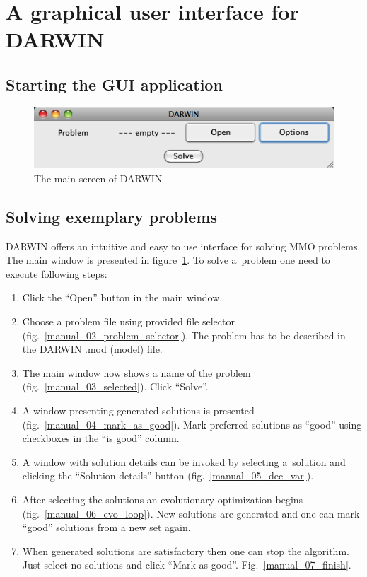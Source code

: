 \label{user-manual}

\section*{A graphical user interface for DARWIN}

\subsection*{Starting the GUI application}

\begin{figure}[htb]
  \centering
  \includegraphics[scale=0.7]{img/manual/01_main_screen}
  \caption{The main screen of DARWIN}
  \label{manual_01_main}
\end{figure}

\subsection*{Solving exemplary problems}

DARWIN offers an intuitive and easy to use interface for solving MMO
problems. The main window is presented in figure~\ref{manual_01_main}. To
solve a~problem one need to execute following steps:

\begin{enumerate}
\item Click the ``Open'' button in the main window.
\item Choose a problem file using provided file selector
  (fig.~\ref{manual_02_problem_selector}). The problem has to be described in
  the DARWIN .mod (model) file.
\item The main window now shows a name of the problem
  (fig.~\ref{manual_03_selected}). Click ``Solve''.
\item A window presenting generated solutions is presented
  (fig.~\ref{manual_04_mark_as_good}). Mark preferred solutions as ``good''
  using checkboxes in the ``is good'' column.
\item A window with solution details can be invoked by selecting a~solution
  and clicking the ``Solution details'' button (fig.~\ref{manual_05_dec_var}).
\item After selecting the solutions an evolutionary optimization begins
  (fig.~\ref{manual_06_evo_loop}). New solutions are generated and one can
  mark ``good'' solutions from a new set again.
\item When generated solutions are satisfactory then one can stop the
  algorithm. Just select no solutions and click ``Mark as
  good''. Fig.~\ref{manual_07_finish}.
\end{enumerate}

